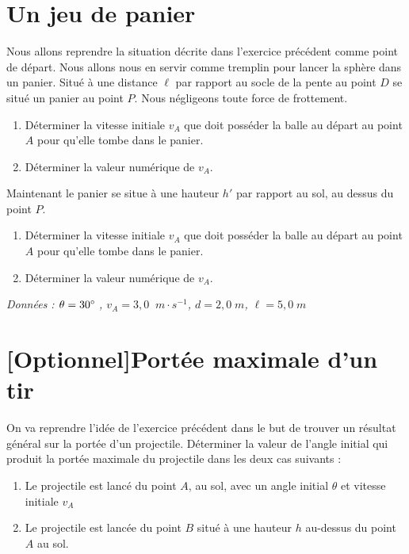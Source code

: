 \documentclass[11pt,a4paper]{article}
\newcommand{\mps}{\; m\cdot s^{-1}}
\begin{document}
\section{Un jeu de panier}
Nous allons reprendre la situation décrite dans l'exercice précédent comme point de départ. Nous allons nous en servir comme tremplin pour lancer la sphère dans un panier. Situé à une distance $\ell$ par rapport au socle de la pente au point $D$ se situé un panier au point $P$. 
Nous négligeons toute force de frottement. 

\begin{enumerate}
    \item  Déterminer la vitesse initiale $v_A$ que doit posséder la balle au départ au point $A$ pour qu'elle tombe dans le panier. 
    \item Déterminer la valeur numérique de $v_A$. 
\end{enumerate}

Maintenant le panier se situe à une hauteur $h'$ par rapport au sol, au dessus du point $P$. 
\begin{enumerate}[resume]
    \item  Déterminer la vitesse initiale $v_A$ que doit posséder la balle au départ au point $A$ pour qu'elle tombe dans le panier. 
    \item Déterminer la valeur numérique de $v_A$. 
\end{enumerate}
\textit{Données : $\theta=30 \degree \;$, $v_A = 3,0\; \mps$, $d=2,0\; m$, $\ell=5,0\; m$}



\section{[Optionnel]Portée maximale d'un tir}

On va reprendre l'idée de l'exercice précédent dans le but de trouver un résultat général sur la portée d'un projectile.
Déterminer la valeur de l'angle initial qui produit la portée maximale du projectile dans les deux cas suivants : 
\begin{enumerate}
    \item Le projectile est lancé du point $A$, au sol, avec un angle initial $\theta$ et vitesse initiale $v_A$
    \item Le projectile est lancée du point $B$ situé à une hauteur $h$ au-dessus du point $A$ au sol. 
\end{enumerate}
\end{document}

